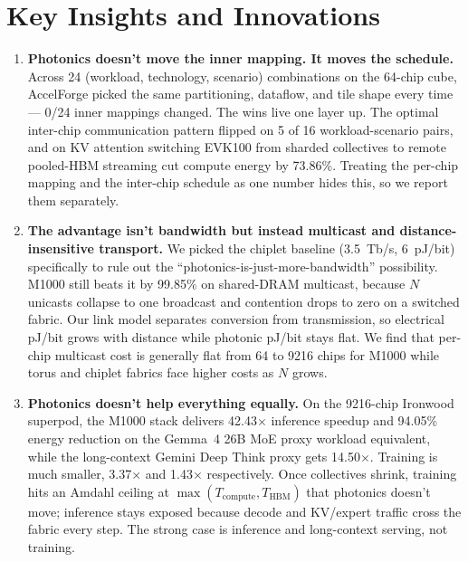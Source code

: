 \documentclass[conference,onecolumn]{IEEEtran}
\newcommand{\tbps}{Tb/s}
\newcommand{\pjbit}{pJ/bit}
\begin{document}
\section{Key Insights and Innovations}
\begin{enumerate}
\item \textbf{Photonics doesn't move the inner mapping. It moves
the schedule.} Across 24 (workload, technology, scenario)
combinations on the 64-chip cube, AccelForge picked the same
partitioning, dataflow, and tile shape every time --- 0/24 inner
mappings changed. The wins live one layer up. The optimal
inter-chip communication pattern flipped on 5 of 16 workload-scenario
pairs, and on KV attention switching EVK100 from sharded collectives
to remote pooled-HBM streaming cut compute energy by 73.86\%.
Treating the per-chip mapping and the inter-chip schedule as one
number hides this, so we report them separately.
 
\item \textbf{The advantage isn't bandwidth but instead multicast and
distance-insensitive transport.} We picked the chiplet baseline
(3.5~\tbps{}, 6~\pjbit{}) specifically to rule out the
``photonics-is-just-more-bandwidth'' possibility. M1000 still beats it by
99.85\% on shared-DRAM multicast, because $N$ unicasts collapse to
one broadcast and contention drops to zero on a switched fabric.
Our link model separates conversion from transmission, so electrical
\pjbit{} grows with distance while photonic \pjbit{} stays flat. We find that per-chip multicast cost is generally flat from 64 to 9216 chips for M1000 while torus and chiplet fabrics face higher costs as $N$ grows.
 
\item \textbf{Photonics doesn't help everything equally.} On the
9216-chip Ironwood superpod, the M1000 stack delivers 42.43$\times$
inference speedup and 94.05\% energy reduction on the Gemma~4 26B
MoE proxy workload equivalent, while the long-context Gemini Deep Think proxy gets
14.50$\times$. Training is much smaller, 3.37$\times$ and
1.43$\times$ respectively. Once collectives shrink, training hits
an Amdahl ceiling at $\max(T_\text{compute}, T_\text{HBM})$ that
photonics doesn't move; inference stays exposed because decode and
KV/expert traffic cross the fabric every step. The strong case is
inference and long-context serving, not training.
\end{enumerate}
 
 
\end{document}
